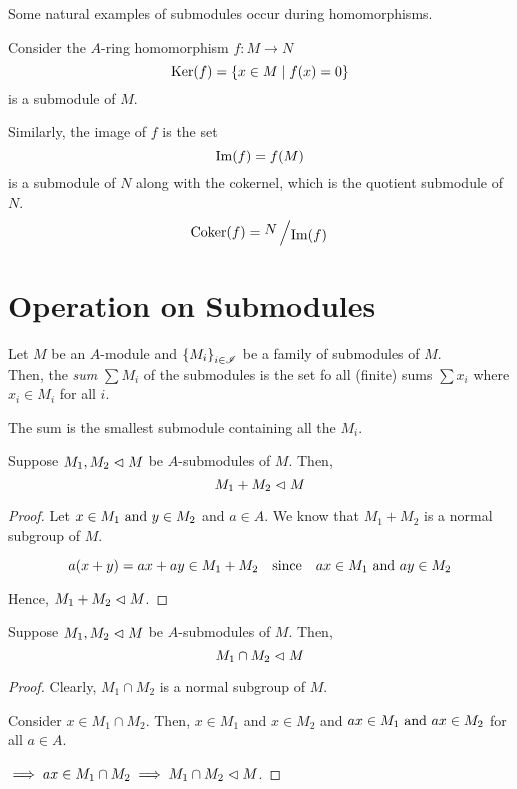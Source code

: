 Some natural examples of submodules occur during homomorphisms.

Consider the \(A\)-ring homomorphism \(f: M \to N\)
\[
	\operatorname{Ker}(f) = \left\{ x \in M \mid f(x) = 0 \right\}
\]
is a submodule of \(M\).

Similarly, the image of \(f\) is the set
\[
	\operatorname{Im}(f) = f(M)
\]
is a submodule of \(N\) along with the cokernel, which is the quotient
submodule of \(N\).
\[
	\Coker(f) = \bigslant{N}{\Img(f)}
\]


\section{Operation on Submodules}

Let \(M\) be an \(A\)-module and \(\left\{ M_i \right\}_{i \in {\mathscr{I}}}\) be a
family of submodules of \(M\). \\
Then, the \emph{sum} \(\sum M_i\) of the submodules is the set
fo all (finite) sums \(\sum x_i\) where \(x_i \in M_i\) for all \(i\).

The sum is the smallest submodule containing all the \(M_i\).

\begin{proposition}{}{}
	Suppose \(M_1, M_2 \vartriangleleft M\) be \(A\)-submodules of \(M\).
	Then,
	\[ M_1 + M_2 \vartriangleleft M \]
\end{proposition}

\begin{proof}
	Let \(x \in M_1 \text{ and } y \in M_2\) and \(a \in A\).
	We know that \(M_1 + M_2\) is a normal subgroup of \(M\).

	\[
		a(x + y) = ax + ay \in M_1 + M_2 \quad \text{since}
		\quad ax \in M_1 \text{ and } ay \in M_2
	\]

	Hence, \(M_1 + M_2 \vartriangleleft M\).
\end{proof}


\begin{proposition}{}{}
	Suppose \(M_1, M_2 \vartriangleleft M\) be \(A\)-submodules of \(M\).
	Then,
	\[ M_1 \cap M_2 \vartriangleleft M \]
\end{proposition}

\begin{proof}
	Clearly, \(M_1 \cap M_2\) is a normal subgroup of \(M\).

	Consider \(x \in M_1 \cap M_2\).
	Then, \(x \in M_1\) and \(x \in M_2\)
	and \(ax \in M_1 \text{ and } ax \in M_2\) for all \(a \in A\).

	\(\implies ax \in M_1 \cap M_2 \implies M_1 \cap M_2 \vartriangleleft M\).
\end{proof}

